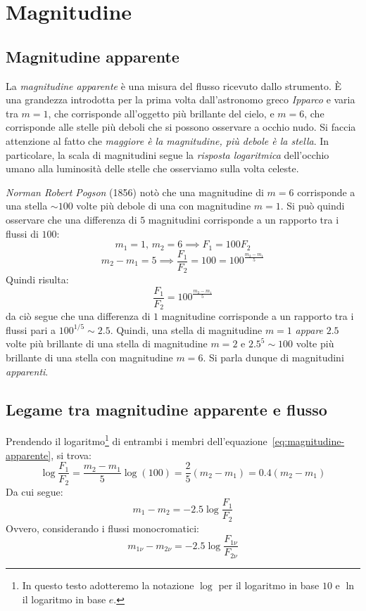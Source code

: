 \section{Magnitudine}\label{sec:magnitudine}
\subsection{Magnitudine apparente}\label{sec:magnitudine-apparente}
La \emph{magnitudine apparente} è una misura del flusso ricevuto dallo strumento. È una grandezza introdotta per la prima volta dall'astronomo greco \emph{Ipparco} e varia tra $m=1$, che corrisponde all'oggetto più brillante del cielo, e $m=6$, che corrisponde alle stelle più deboli che si possono osservare a occhio nudo. Si faccia attenzione al fatto che \emph{maggiore è la magnitudine, più debole è la stella}. In particolare, la scala di magnitudini segue la \emph{risposta logaritmica} dell'occhio umano alla luminosità delle stelle che osserviamo sulla volta celeste.

\emph{Norman Robert Pogson} (1856) notò che una magnitudine di $m=6$ corrisponde a una stella $\sim 100$ volte più debole di una con magnitudine $m=1$. Si può quindi osservare che una differenza di $5$ magnitudini corrisponde a un rapporto tra i flussi di $100$:
\[
    m_1=1, \,  m_2=6 \implies F_1 = 100 F_2
\]
\[
    m_2 - m_1 = 5 \implies \frac{F_1}{F_2} = 100 = 100^{\frac{m_2 - m_1}{5}}
\]
Quindi risulta:
\begin{equation}\label{eq:magnitudine-apparente}
    \frac{F_1}{F_2} = 100^{\frac{m_2 - m_1}{5}}
\end{equation}
da ciò segue che una differenza di $1$ magnitudine corrisponde a un rapporto tra i flussi pari a $100^{1 / 5} \sim 2.5$. Quindi, una stella di magnitudine $m=1$ \emph{appare} $2.5$ volte più brillante di una stella di magnitudine $m=2$ e $2.5^5 \sim 100$ volte più brillante di una stella con magnitudine $m=6$. Si parla dunque di magnitudini \emph{apparenti}.

\subsection{Legame tra magnitudine apparente e flusso}\label{sec:relazione-magnitudine-apparente-flusso}
Prendendo il logaritmo\footnote{In questo testo adotteremo la notazione $\log$ per il logaritmo in base $10$ e $\ln$ il logaritmo in base $e$.} di entrambi i membri dell'equazione~\eqref{eq:magnitudine-apparente}, si trova:
\[
    \log\frac{F_1}{F_2} = \frac{m_2 - m_1}{5} \log(100) = \frac{2}{5} (m_2 - m_1) = 0.4 (m_2 - m_1)
\]
Da cui segue:
\begin{equation}\label{eq:relazione-magnitudine-apparente-flusso}
    m_1 - m_2 = -2.5 \log\frac{F_1}{F_2}
\end{equation}
Ovvero, considerando i flussi monocromatici:
\begin{equation}\label{eq:relazione-magnitudine-apparente-flusso-monocromatico}
    m_{1\nu} - m_{2\nu} = -2.5 \log\frac{F_{1\nu}}{F_{2\nu}}
\end{equation}

